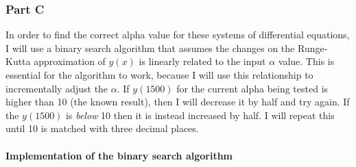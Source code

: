 \documentclass[11pt]{article}
\begin{document}
\hypertarget{part-c}{%
\subsubsection{Part C}\label{part-c}}

In order to find the correct alpha value for these systems of
differential equations, I will use a binary search algorithm that
assumes the changes on the Runge-Kutta approximation of \(y(x)\) is
linearly related to the input \(\alpha\) value. This is essential for
the algorithm to work, because I will use this relationship to
incrementally adjust the \(\alpha\). If \(y(1500)\) for the current
alpha being tested is higher than 10 (the known result), then I will
decrease it by half and try again. If the \(y(1500)\) is \emph{below} 10
then it is instead increased by half. I will repeat this until 10 is
matched with three decimal places.

\hypertarget{implementation-of-the-binary-search-algorithm}{%
\paragraph{Implementation of the binary search
algorithm}\label{implementation-of-the-binary-search-algorithm}}
\end{document}
